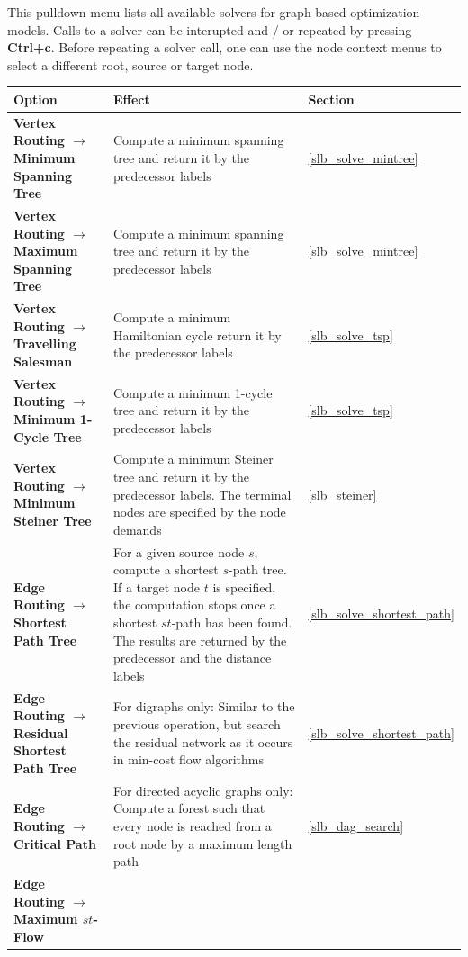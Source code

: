 \documentclass[a4paper,11pt,twoside]{book}
\begin{document}
This pulldown menu lists all available solvers for graph based optimization
models. Calls to a solver can be interupted and / or repeated by pressing
{\bf Ctrl+c}. Before repeating a solver call, one can use the node context
menus to select a different root, source or target node.

\bigskip
\noindent
\begin{tabular}{p{9.3cm}|p{14cm}|p{1.5cm}} 
\large\bf Option & \large\bf Effect & \large\bf Section \\
[1mm] \hline \hline
\bf  Vertex Routing $\rightarrow$ Minimum Spanning Tree &
     Compute a minimum spanning tree and return it by the predecessor labels &
     \ref{slb_solve_mintree} \\ \hline
\bf  Vertex Routing $\rightarrow$ Maximum Spanning Tree &
     Compute a minimum spanning tree and return it by the predecessor labels &
     \ref{slb_solve_mintree} \\ \hline
\bf  Vertex Routing $\rightarrow$ Travelling Salesman &
     Compute a minimum Hamiltonian cycle return it by the predecessor labels &
     \ref{slb_solve_tsp} \\ \hline
\bf  Vertex Routing $\rightarrow$ Minimum 1-Cycle Tree &
     Compute a minimum 1-cycle tree and return it by the predecessor labels &
     \ref{slb_solve_tsp} \\ \hline
\bf  Vertex Routing $\rightarrow$ Minimum Steiner Tree &
     Compute a minimum Steiner tree and return it by the predecessor labels.
     The terminal nodes are specified by the node demands &
     \ref{slb_steiner} \\ \hline
\bf  Edge Routing $\rightarrow$ Shortest Path Tree &
     For a given source node $s$, compute a shortest $s$-path tree. If a target
     node $t$ is specified, the computation stops once a shortest $st$-path has been
     found. The results are returned by the predecessor and the distance labels &
     \ref{slb_solve_shortest_path} \\ \hline
\bf  Edge Routing $\rightarrow$ Residual Shortest Path Tree &
     For digraphs only: Similar to the previous operation, but search the residual
     network as it occurs in min-cost flow algorithms &
     \ref{slb_solve_shortest_path} \\ \hline
\bf  Edge Routing $\rightarrow$ Critical Path &
     For directed acyclic graphs only: Compute a forest such that every node
     is reached from a root node by a maximum length path &
     \ref{slb_dag_search} \\ \hline
\bf  Edge Routing $\rightarrow$ Maximum $st$-Flow &

\end{tabular}
\end{document}
